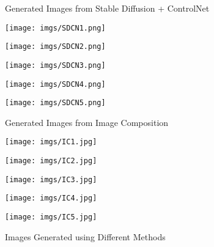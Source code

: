 \begin{figure*}[t]
        
    \vspace{1em} %
    \caption*{Generated Images from Stable Diffusion + ControlNet}
    \begin{minipage}{\textwidth}
        \centering
        \begin{minipage}{0.18\textwidth}
            \centering
            \texttt{[image: imgs/SDCN1.png]}
        \end{minipage} \hfill
        \begin{minipage}{0.18\textwidth}
            \centering
            \texttt{[image: imgs/SDCN2.png]}
        \end{minipage} \hfill
        \begin{minipage}{0.18\textwidth}
            \centering
            \texttt{[image: imgs/SDCN3.png]}
        \end{minipage} \hfill
        \begin{minipage}{0.18\textwidth}
            \centering
            \texttt{[image: imgs/SDCN4.png]}
        \end{minipage} \hfill
        \begin{minipage}{0.18\textwidth}
            \centering
            \texttt{[image: imgs/SDCN5.png]}
        \end{minipage}
    \end{minipage}
    
    \vspace{1em} %

    \caption*{Generated Images from Image Composition}
    \begin{minipage}{\textwidth}
        \centering
        \begin{minipage}{0.18\textwidth}
            \centering
            \texttt{[image: imgs/IC1.jpg]}
        \end{minipage} \hfill
        \begin{minipage}{0.18\textwidth}
            \centering
            \texttt{[image: imgs/IC2.jpg]}
        \end{minipage} \hfill
        \begin{minipage}{0.18\textwidth}
            \centering
            \texttt{[image: imgs/IC3.jpg]}
        \end{minipage} \hfill
        \begin{minipage}{0.18\textwidth}
            \centering
            \texttt{[image: imgs/IC4.jpg]}
        \end{minipage} \hfill
        \begin{minipage}{0.18\textwidth}
            \centering
            \texttt{[image: imgs/IC5.jpg]}
        \end{minipage}
    \end{minipage}
    \vspace{1em}
    \caption{Images Generated using Different Methods}
    \label{fig:generated_images}
\end{figure*}




